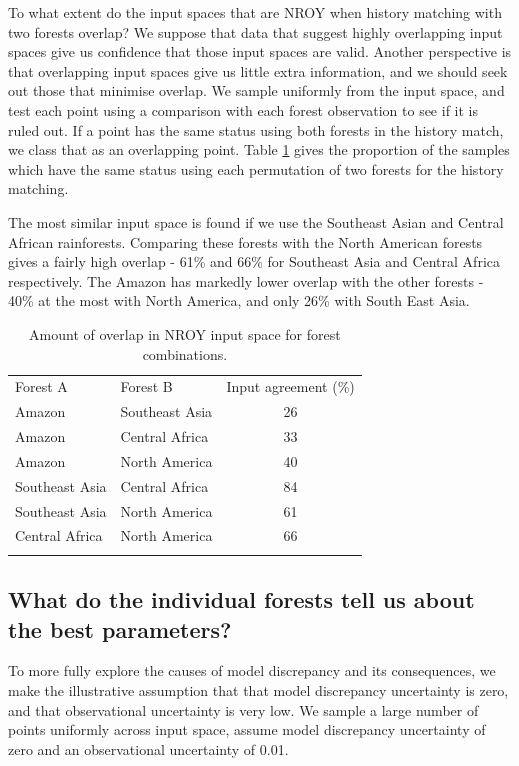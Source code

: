 \documentclass[esd, article]{copernicus} %
\begin{document}

To what extent do the input spaces that are NROY when history matching with two forests overlap? We suppose that data that suggest highly overlapping input spaces give us confidence that those input spaces are valid. Another perspective is that overlapping input spaces give us little extra information, and we should seek out those that minimise overlap. We sample uniformly from the input space, and test each point using a comparison with each forest observation to see if it is ruled out. If a point has the same status using both forests in the history match, we class that as an overlapping point. Table \ref{tab:input_overlap} gives the proportion of the samples which have the same status using each permutation of two forests for the history matching.

The most similar input space is found if we use the Southeast Asian and Central African rainforests. Comparing these forests with the North American forests gives a fairly high overlap - 61\% and 66\% for Southeast Asia and Central Africa respectively. The Amazon has markedly lower overlap with the other forests - 40\% at the most with North America, and only 26\% with South East Asia.


\begin{table}[t]
\caption{Amount of overlap in NROY input space for forest combinations.}\label{tab:input_overlap}
\begin{tabular}{llc}

\tophline
Forest A &  Forest B & Input agreement (\%) \\
Amazon & Southeast Asia & 26 \\
Amazon & Central Africa & 33 \\
Amazon & North America & 40 \\
Southeast Asia & Central Africa & 84 \\
Southeast Asia & North America & 61 \\
Central Africa  & North America & 66 \\
\bottomhline
\end{tabular}
\belowtable{} %
\end{table}

\subsection{What do the individual forests tell us about the best parameters?}\label{ssec:learn}
To more fully explore the causes of model discrepancy and its consequences, we make the illustrative assumption that that model discrepancy uncertainty is zero, and that observational uncertainty is very low. We sample a large number of points uniformly across input space, assume model discrepancy uncertainty of zero and an observational uncertainty of 0.01.
\end{document}
